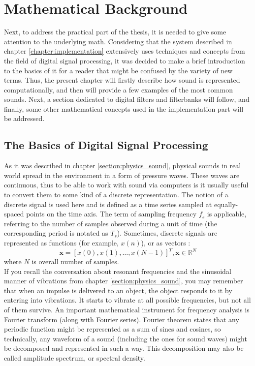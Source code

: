\chapter{Mathematical Background}\label{chapter:math}

Next, to address the practical part of the thesis, it is needed to give some attention to the underlying math. Considering that the system described in chapter \ref{chapter:implementation} extensively uses techniques and concepts from the field of digital signal processing, it was decided to make a brief introduction to the basics of it for a reader that might be confused by the variety of new terms. Thus, the present chapter will firstly describe how sound is represented computationally, and then will provide a few examples of the most common sounds. Next, a section dedicated to digital filters and filterbanks will follow, and finally, some other mathematical concepts used in the implementation part will be addressed.

\section{The Basics of Digital Signal Processing}\label{section:math_basics}

As it was described in chapter \ref{section:physics_sound}, physical sounds in real world spread in the environment in a form of pressure waves. These waves are continuous, thus to be able to work with sound via computers is it usually useful to convert them to some kind of a discrete representation. The notion of a discrete signal is used here and is defined as a time series sampled at equally-spaced points on the time axis. The term of sampling frequency $f_s$ is applicable, referring to the number of samples observed during a unit of time (the corresponding period is notated as $T_s$). Sometimes, discrete signals are represented as functions (for example, $x(n)$), or as vectors \cite{Abood2020}: $$\textbf{x} = [x(0), x(1), \dots{}, x(N - 1)]^T, \textbf{x}\in\mathbb{R}^N$$ where $N$ is overall number of samples.\\

If you recall the conversation about resonant frequencies and the sinusoidal manner of vibrations from chapter \ref{section:physics_sound}, you may remember that when an impulse is delivered to an object, the object responds to it by entering into vibrations. It starts to vibrate at all possible frequencies, but not all of them survive. An important mathematical instrument for frequency analysis is Fourier transform (along with Fourier series). Fourier theorem states that any periodic function might be represented as a sum of sines and cosines, so technically, any waveform of a sound (including the ones for sound waves) might be decomposed and represented in such a way. This decomposition may also be called amplitude spectrum, or spectral density.\\

